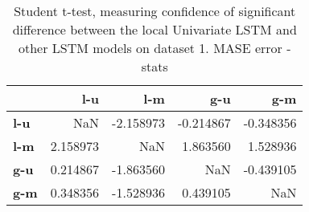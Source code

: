 \begin{table}[H]
\centering
\caption{Student t-test, measuring confidence of significant difference between the local Univariate LSTM and other LSTM models on dataset 1. MASE error - stats}
\label{table:ttest-stats-lstm-experiments-MASE-dataset-1}
\begin{tabular}{lrrrr}
\toprule
{} &       l-u &       l-m &       g-u &       g-m \\
\midrule
\textbf{l-u} &       NaN & -2.158973 & -0.214867 & -0.348356 \\
\textbf{l-m} &  2.158973 &       NaN &  1.863560 &  1.528936 \\
\textbf{g-u} &  0.214867 & -1.863560 &       NaN & -0.439105 \\
\textbf{g-m} &  0.348356 & -1.528936 &  0.439105 &       NaN \\
\bottomrule
\end{tabular}
\end{table}

